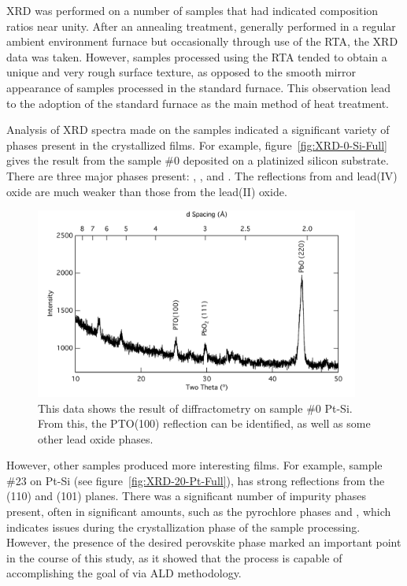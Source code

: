 XRD was performed on a number of samples that had indicated composition ratios near unity. After an annealing treatment, generally performed in a regular ambient environment furnace but occasionally through use of the RTA, the XRD data was taken. However, samples processed using the RTA tended to obtain a unique and very rough surface texture, as opposed to the smooth mirror appearance of samples processed in the standard furnace. This observation lead to the adoption of the standard furnace as the main method of heat treatment. 

Analysis of XRD spectra made on the samples indicated a significant variety of phases present in the crystallized films. For example, figure~\vref{fig:XRD-0-Si-Full} gives the result from the sample \#0 deposited on a platinized silicon substrate. There are three major phases present: , , and \PTO{}. The reflections from \PTO{} and lead(IV) oxide are much weaker than those from the lead(II) oxide. 

\begin{figure}[htbp]
	\centering
	\includegraphics[width=0.95\textwidth]{./Figures/Data/XRD/Run-0-si/10-50}
	\caption[XRD Scan of \#0 on Si]%
		{This data shows the result of diffractometry on sample \#0 Pt-Si. From this, the %
		PTO(100) reflection can be identified, as well as some other lead oxide phases.}
	\label{fig:XRD-0-Si-Full}
\end{figure}

However, other samples produced more interesting films. For example, sample \#23 on Pt-Si (see figure~\vref{fig:XRD-20-Pt-Full}), has strong reflections from the \PTO{} (110) and (101) planes. There was a significant number of impurity phases present, often in significant amounts, such as the pyrochlore phases  and , which indicates issues during the crystallization phase of the sample processing. However, the presence of the desired perovskite phase marked an important point in the course of this study, as it showed that the process is capable of accomplishing the goal of \PTO{} via ALD methodology. 

